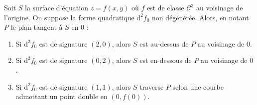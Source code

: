 
  \begin{application}
    Soit $S$ la surface d'équation $z = f(x, y)$ où $f$ est de classe $\mathcal{C}^3$ au voisinage de l'origine. On suppose la forme quadratique $\mathrm{d}^2 f_0$ non dégénérée. Alors, en notant $P$ le plan tangent à $S$ en $0$ :
    \begin{enumerate}[label=(\roman*)]
      \item Si $\mathrm{d}^2 f_0$ est de signature $(2, 0)$, alors $S$ est au-dessus de $P$ au voisinage de $0$.
      \item Si $\mathrm{d}^2 f_0$ est de signature $(0, 2)$, alors $S$ est en-dessous de $P$ au voisinage de $0$.
      \item Si $\mathrm{d}^2 f_0$ est de signature $(1, 1)$, alors $S$ traverse $P$ selon une courbe admettant un point double en $(0, f(0))$.
    \end{enumerate}
  \end{application}

